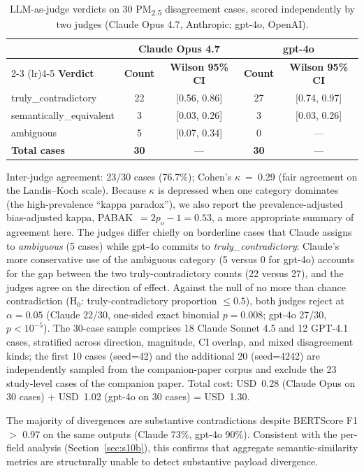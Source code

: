 \documentclass[11pt]{article}
\begin{document}
\begin{table}[H]
\centering
\caption{LLM-as-judge verdicts on 30 PM\textsubscript{2.5} disagreement cases, scored independently by two judges (Claude Opus 4.7, Anthropic; gpt-4o, OpenAI).}
\label{tab:t3-verdicts}
\small
\begin{tabular}{@{}lcccc@{}}
\toprule
& \multicolumn{2}{c}{\textbf{Claude Opus 4.7}} & \multicolumn{2}{c}{\textbf{gpt-4o}} \\
\cmidrule(lr){2-3} \cmidrule(lr){4-5}
\textbf{Verdict} & \textbf{Count} & \textbf{Wilson 95\% CI} & \textbf{Count} & \textbf{Wilson 95\% CI} \\
\midrule
truly\_contradictory     & 22 & [0.56, 0.86] & 27 & [0.74, 0.97] \\
semantically\_equivalent &  3 & [0.03, 0.26] &  3 & [0.03, 0.26] \\
ambiguous                &  5 & [0.07, 0.34] &  0 & ---           \\
\midrule
\textbf{Total cases}     & \textbf{30} & --- & \textbf{30} & --- \\
\bottomrule
\end{tabular}
\par\smallskip\raggedright\footnotesize
Inter-judge agreement: 23/30 cases (76.7\%); Cohen's $\kappa$~=~0.29 (fair agreement on the Landis--Koch scale). Because $\kappa$ is depressed when one category dominates (the high-prevalence ``kappa paradox''), we also report the prevalence-adjusted bias-adjusted kappa, PABAK~$=2p_o-1=0.53$, a more appropriate summary of agreement here. The judges differ chiefly on borderline cases that Claude assigns to \emph{ambiguous} (5 cases) while gpt-4o commits to \emph{truly\_contradictory}: Claude's more conservative use of the ambiguous category (5 versus 0 for gpt-4o) accounts for the gap between the two truly-contradictory counts (22 versus 27), and the judges agree on the direction of effect. Against the null of no more than chance contradiction (H$_0$: truly-contradictory proportion $\leq 0.5$), both judges reject at $\alpha = 0.05$ (Claude 22/30, one-sided exact binomial $p = 0.008$; gpt-4o 27/30, $p < 10^{-5}$). The 30-case sample comprises 18 Claude Sonnet 4.5 and 12 GPT-4.1 cases, stratified across direction, magnitude, CI overlap, and mixed disagreement kinds; the first 10 cases (seed=42) and the additional 20 (seed=4242) are independently sampled from the companion-paper corpus and exclude the 23 study-level cases of the companion paper. Total cost: USD~0.28 (Claude Opus on 30 cases) + USD~1.02 (gpt-4o on 30 cases) = USD~1.30.
\par\smallskip\raggedright\footnotesize
The majority of divergences are substantive contradictions despite BERTScore F1 $>$ 0.97 on the same outputs (Claude 73\%, gpt-4o 90\%). Consistent with the per-field analysis (Section~\ref{sec:s10b}), this confirms that aggregate semantic-similarity metrics are structurally unable to detect substantive payload divergence.
\end{table}
\end{document}
